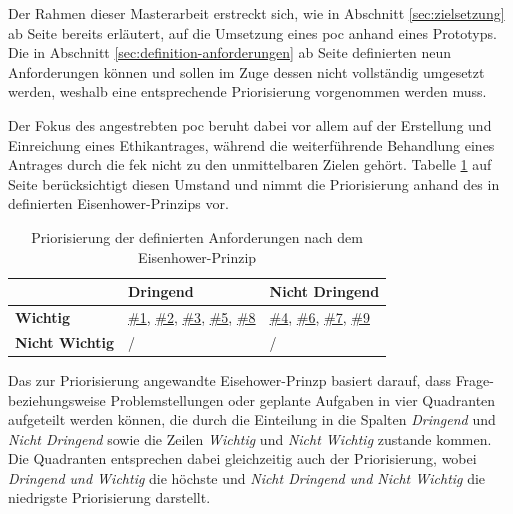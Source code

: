 \documentclass[a4paper,12pt,twoside]{scrreprt}
\begin{document}
Der Rahmen dieser Masterarbeit erstreckt sich, wie in Abschnitt \ref{sec:zielsetzung} ab Seite \pageref{sec:zielsetzung} bereits erläutert, auf die Umsetzung eines \ac{poc} anhand eines Prototyps. Die in Abschnitt \ref{sec:definition-anforderungen} ab Seite \pageref{sec:definition-anforderungen} definierten neun Anforderungen können und sollen im Zuge dessen nicht vollständig umgesetzt werden, weshalb eine entsprechende Priorisierung vorgenommen werden muss.

\medskip

Der Fokus des angestrebten \ac{poc} beruht dabei vor allem auf der Erstellung und Einreichung eines Ethikantrages, während die weiterführende Behandlung eines Antrages durch die \ac{fek} nicht zu den unmittelbaren Zielen gehört. Tabelle \ref{tab:priorisierung-anforderungen} auf Seite \pageref{tab:priorisierung-anforderungen} berücksichtigt diesen Umstand und nimmt die Priorisierung anhand des in \cite{chai_what_2020} definierten Eisenhower-Prinzips vor.

\begin{table}[ht!]
    \begin{tabular}{p{.15\linewidth} | p{.35\linewidth} | p{.35\linewidth}}
        & \textbf{Dringend} & \textbf{Nicht Dringend} \\
        \hline
        \textbf{Wichtig} & \hyperref[sub-sub-sec:abgeleitete-anforderungen-vorfeld-antrag]{\#1}, \hyperref[sub-sub-sec:abgeleitete-anforderungen-während-erstellung-einreichung]{\#2}, \hyperref[sub-sub-sec:abgeleitete-anforderungen-während-erstellung-einreichung]{\#3}, \hyperref[sub-sub-sec:abgeleitete-anforderungen-während-erstellung-einreichung]{\#5},  \hyperref[sub-sub-sec:abgeleitete-anforderungen-nach-einreichung]{\#8} & \hyperref[sub-sub-sec:abgeleitete-anforderungen-während-erstellung-einreichung]{\#4}, \hyperref[sub-sub-sec:abgeleitete-anforderungen-während-erstellung-einreichung]{\#6}, \hyperref[sub-sub-sec:abgeleitete-anforderungen-nach-einreichung]{\#7}, \hyperref[sub-sub-sec:abgeleitete-anforderungen-nach-einreichung]{\#9} \\
        \hline
        \textbf{Nicht Wichtig} & / & /
    \end{tabular}
    \caption{Priorisierung der definierten Anforderungen nach dem Eisenhower-Prinzip}
    \label{tab:priorisierung-anforderungen}
\end{table}

Das zur Priorisierung angewandte Eisehower-Prinzp basiert darauf, dass Frage- beziehungsweise Problemstellungen oder geplante Aufgaben in vier Quadranten aufgeteilt werden können, die durch die Einteilung in die Spalten \textit{Dringend} und \textit{Nicht Dringend} sowie die Zeilen \textit{Wichtig} und \textit{Nicht Wichtig} zustande kommen. Die Quadranten entsprechen dabei gleichzeitig auch der Priorisierung, wobei \textit{Dringend und Wichtig} die höchste und \textit{Nicht Dringend und Nicht Wichtig} die niedrigste Priorisierung darstellt. \cite{chai_what_2020}
\end{document}
